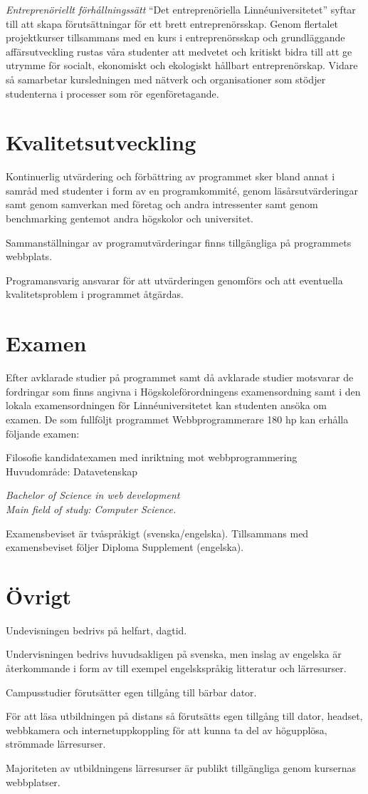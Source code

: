 \documentclass[swedish]{LnuCmThesis}
\begin{document}
\textit{Entreprenöriellt förhållningssätt}
“Det entreprenöriella Linnéuniversitetet” syftar till att skapa förutsättningar för ett brett entreprenörsskap. Genom flertalet projektkurser tillsammans med en kurs i entreprenörsskap och grundläggande affärsutveckling rustas våra studenter att medvetet och kritiskt bidra till att ge utrymme för socialt, ekonomiskt och ekologiskt hållbart entreprenörskap.
Vidare så samarbetar kursledningen med nätverk och organisationer som stödjer studenterna i processer som rör egenföretagande.

\section*{Kvalitetsutveckling}

Kontinuerlig utvärdering och förbättring av programmet sker bland annat i samråd med studenter i form av en programkommité, genom läsårsutvärderingar samt genom samverkan med företag och andra intressenter samt genom benchmarking gentemot andra högskolor och universitet.

Sammanställningar av programutvärderingar finns tillgängliga på programmets webbplats.

Programansvarig ansvarar för att utvärderingen genomförs och att eventuella kvalitetsproblem i programmet åtgärdas.

\section*{Examen}

Efter avklarade studier på programmet samt då avklarade studier motsvarar de fordringar som finns angivna i Högskoleförordningens examensordning samt i den lokala examensordningen för Linnéuniversitetet kan studenten ansöka om examen. De som fullföljt programmet Webbprogrammerare 180 hp kan erhålla följande examen:

Filosofie kandidatexamen med inriktning mot webbprogrammering\\
Huvudområde: Datavetenskap

\textit{Bachelor of Science in web development\\
Main field of study: Computer Science.}

Examensbeviset är tvåspråkigt (svenska/engelska). Tillsammans med
examensbeviset följer Diploma Supplement (engelska).

\section*{Övrigt}
Undevisningen bedrivs på helfart, dagtid.

Undervisningen bedrivs huvudsakligen på svenska, men inslag av engelska är
återkommande i form av till exempel engelskspråkig litteratur och lärresurser.

Campusstudier förutsätter egen tillgång till bärbar dator.

För att läsa utbildningen på distans så förutsätts egen tillgång till dator, headset,
webbkamera och internetuppkoppling för att kunna ta del av högupplösa, strömmade lärresurser.

Majoriteten av utbildningens lärresurser är publikt tillgängliga genom kursernas
webbplatser.
\end{document}
